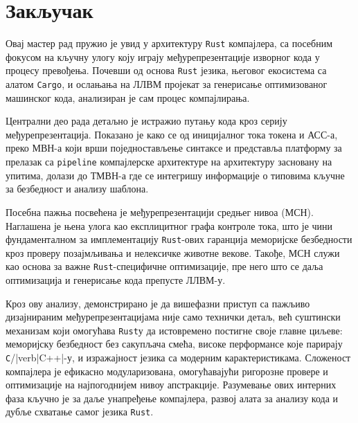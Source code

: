 \section{Закључак}

Овај мастер рад пружио је увид у архитектуру \verb|Rust| компајлера, са посебним фокусом на кључну улогу коју играју међурепрезентације изворног кода у процесу превођења. 
Почевши од основа \verb|Rust| језика, његовог екосистема са алатом \verb|Cargo|, и ослањања на ЛЛВМ пројекат за генерисање оптимизованог машинског кода, 
анализиран је сам процес компајлирања.

Централни део рада детаљно је истражио путању кода кроз серију међурепрезентација. 
Показано је како се од иницијалног тока токена и АСС-а, преко МВН-а који врши поједностављење синтаксе и представља платформу за прелазак са \verb|pipeline|
компајлерске архитектуре на архитектуру засновану на упитима, долази до ТМВН-а где се интегришу информације о типовима кључне за безбедност 
и анализу шаблона.

Посебна пажња посвећена је међурепрезентацији средњег нивоа (МСН). Наглашена је њена улога као експлицитног графа контроле тока,
што је чини фундаменталном за имплементацију \verb|Rust|-ових гаранција меморијске безбедности кроз проверу позајмљивања и нелексичке животне векове.
Такође, МСН служи као основа за важне \verb|Rust|-специфичне оптимизације, пре него што се даља оптимизација и генерисање кода препусте ЛЛВМ-у.

Кроз ову анализу, демонстрирано је да вишефазни приступ са пажљиво дизајнираним међурепрезентацијама није само технички детаљ,
већ суштински механизам који омогућава \verb|Rust|у да истовремено постигне своје главне циљеве: меморијску безбедност без сакупљача смећа,
високе перформансе које парирају \verb|C|/|verb|C++|-у, и изражајност језика са модерним карактеристикама. Сложеност компајлера је ефикасно модуларизована,
омогућавајући ригорозне провере и оптимизације на најпогоднијем нивоу апстракције. Разумевање ових интерних фаза кључно је за даље унапређење компајлера,
развој алата за анализу кода и дубље схватање самог језика \verb|Rust|.  